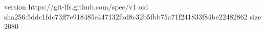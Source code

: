 version https://git-lfs.github.com/spec/v1
oid sha256:5ddc1fdc73ff7e918485e447132fad8c32b5fbb75a71f241833f84be22482862
size 2080

